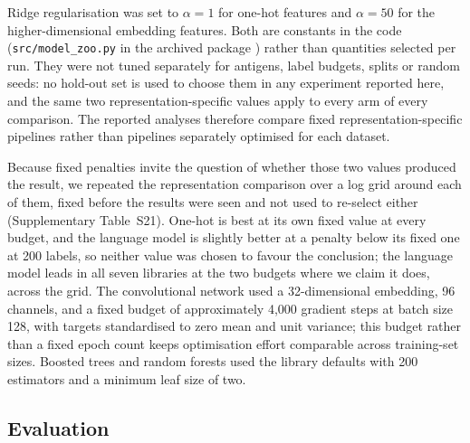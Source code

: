 \documentclass[pdflatex,sn-nature]{sn-jnl}
\theoremstyle{thmstyleone}
\theoremstyle{thmstyletwo}
\theoremstyle{thmstylethree}
\begin{document}
Ridge regularisation was set to $\alpha = 1$ for one-hot features and
$\alpha = 50$ for the higher-dimensional embedding features. Both are
constants in the code (\texttt{src/model\_zoo.py} in the archived package
\cite{libmatch2026}) rather than quantities selected per run. They were not
tuned separately for antigens, label budgets, splits or random seeds: no
hold-out set is used to choose them in any experiment reported here, and the
same two representation-specific values apply to every arm of every
comparison. The reported analyses therefore compare fixed
representation-specific pipelines rather than pipelines separately optimised
for each dataset.

Because fixed penalties invite the question of whether those two values
produced the result, we repeated the representation comparison over a log
grid around each of them, fixed before the results were seen and not used to
re-select either (Supplementary Table~S21). One-hot is best at its own fixed
value at every budget, and the language model is slightly better at a penalty
below its fixed one at 200 labels, so neither value was chosen to favour the
conclusion; the language model leads in all seven libraries at the two
budgets where we claim it does, across the grid. The
convolutional network used a 32-dimensional embedding, 96 channels, and a fixed
budget of approximately 4{,}000 gradient steps at batch size 128, with targets
standardised to zero mean and unit variance; this budget rather than a fixed
epoch count keeps optimisation effort comparable across training-set sizes.
Boosted trees and random forests used the library defaults with 200 estimators
and a minimum leaf size of two.

\subsection*{Evaluation}
\end{document}
